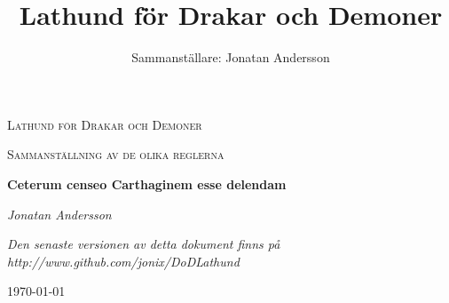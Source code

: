 \documentclass[a4paper, 10pt, titlepage]{article}
\title{Lathund för Drakar och Demoner}
\author{Sammanställare: Jonatan Andersson}
\date{ }
\begin{document}
\begin{titlepage}
        \centering
        {\scshape\LARGE Lathund för Drakar och Demoner \par}
        \vspace{1cm}
        {\scshape\Large Sammanställning av de olika reglerna\par}
        \vspace{1.5cm}
        {\huge\bfseries Ceterum censeo Carthaginem esse delendam\par}
        \vspace{2cm}
        {\Large\itshape Jonatan Andersson\par}
        \vspace{2cm}
        {\small\itshape Den senaste versionen av detta dokument finns på http://www.github.com/jonix/DoDLathund\par}
        \vfill
        {\large \today\par}
        \vfill


\end{titlepage}

\tableofcontents
\newpage
\end{document}
